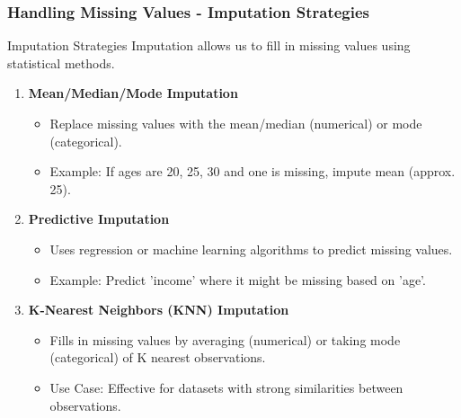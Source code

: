 \documentclass[aspectratio=169]{beamer}
\begin{document}
\begin{frame}[fragile]
    \frametitle{Handling Missing Values - Imputation Strategies}
    \begin{block}{Imputation Strategies}
        Imputation allows us to fill in missing values using statistical methods.
    \end{block}
    \begin{enumerate}
        \item \textbf{Mean/Median/Mode Imputation}
        \begin{itemize}
            \item Replace missing values with the mean/median (numerical) or mode (categorical).
            \item Example: If ages are 20, 25, 30 and one is missing, impute mean (approx. 25).
        \end{itemize}
        \item \textbf{Predictive Imputation}
        \begin{itemize}
            \item Uses regression or machine learning algorithms to predict missing values.
            \item Example: Predict 'income' where it might be missing based on 'age'.
        \end{itemize}
        \item \textbf{K-Nearest Neighbors (KNN) Imputation}
        \begin{itemize}
            \item Fills in missing values by averaging (numerical) or taking mode (categorical) of K nearest observations.
            \item Use Case: Effective for datasets with strong similarities between observations.
        \end{itemize}
    \end{enumerate}
\end{frame}
\end{document}
